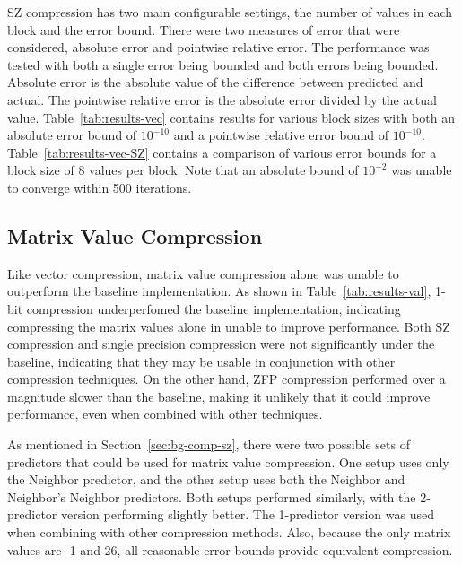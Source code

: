 

SZ compression has two main configurable settings, the number of values in each block and the error bound.
There were two measures of error that were considered, absolute error and pointwise relative error.
The performance was tested with both a single error being bounded and both errors being bounded.
Absolute error is the absolute value of the difference between predicted and actual.
The pointwise relative error is the absolute error divided by the actual value.
Table~\ref{tab:results-vec} contains results for various block sizes with both an absolute error bound of \(10^{-10}\) and a pointwise relative error bound of \(10^{-10}\).
Table~\ref{tab:results-vec-SZ} contains a comparison of various error bounds for a block size of 8 values per block.
Note that an absolute bound of \(10^{-2}\) was unable to converge within 500 iterations.




\subsection{Matrix Value Compression}
\label{sec:results-vals}
Like vector compression, matrix value compression alone was unable to outperform the baseline implementation.
As shown in Table~\ref{tab:results-val}, 1-bit compression underperfomed the baseline implementation, indicating compressing the matrix values alone in unable to improve performance.
Both SZ compression and single precision compression were not significantly under the baseline, indicating that they may be usable in conjunction with other compression techniques.
On the other hand, ZFP compression performed over a magnitude slower than the baseline, making it unlikely that it could improve performance, even when combined with other techniques.

As mentioned in Section~\ref{sec:bg-comp-sz}, there were two possible sets of predictors that could be used for matrix value compression.
One setup uses only the Neighbor predictor, and the other setup uses both the Neighbor and Neighbor's Neighbor predictors.
Both setups performed similarly, with the 2-predictor version performing slightly better.
The 1-predictor version was used when combining with other compression methods.
Also, because the only matrix values are -1 and 26, all reasonable error bounds provide equivalent compression.

